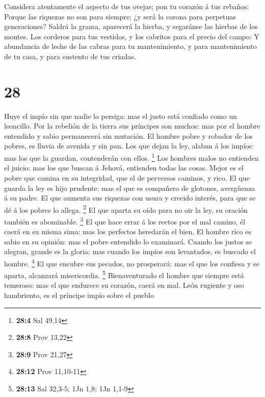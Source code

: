  Considera atentamente el aspecto de tus ovejas; pon tu
corazón á tus rebaños:  Porque las riquezas no son para
siempre; ¿y será la corona para perpetuas generaciones? 
Saldrá la grama, aparecerá la hierba, y segaránse las hierbas de los
montes.  Los corderos para tus vestidos, y los cabritos
para el precio del campo:  Y abundancia de leche de las
cabras para tu mantenimiento, y para mantenimiento de tu casa, y para
sustento de tus criadas.

\hypertarget{section-27}{%
\section{28}\label{section-27}}

 Huye el impío sin que nadie lo persiga: mas el justo está
confiado como un leoncillo.  Por la rebelión de la tierra
sus príncipes son muchos: mas por el hombre entendido y sabio
permanecerá sin mutación.  El hombre pobre y robador de
los pobres, es lluvia de avenida y sin pan.  Los que dejan
la ley, alaban á los impíos: mas los que la guardan, contenderán con
ellos. \footnote{\textbf{28:4} Sal 49,14}  Los hombres
malos no entienden el juicio: mas los que buscan á Jehová, entienden
todas las cosas.  Mejor es el pobre que camina en su
integridad, que el de perversos caminos, y rico.  El que
guarda la ley es hijo prudente: mas el que es compañero de glotones,
avergüenza á su padre.  El que aumenta sus riquezas con
usura y crecido interés, para que se dé á los pobres lo allega.
\footnote{\textbf{28:8} Prov 13,22}  El que aparta su oído
para no oir la ley, su oración también es abominable. \footnote{\textbf{28:9}
  Prov 21,27}  El que hace errar á los rectos por el mal
camino, él caerá en su misma sima: mas los perfectos heredarán el bien.
 El hombre rico es sabio en su opinión: mas el pobre
entendido lo examinará.  Cuando los justos se alegran,
grande es la gloria; mas cuando los impíos son levantados, es buscado el
hombre. \footnote{\textbf{28:12} Prov 11,10-11}  El que
encubre sus pecados, no prosperará: mas el que los confiesa y se aparta,
alcanzará misericordia. \footnote{\textbf{28:13} Sal 32,3-5; 1Jn 1,8;
  1Jn 1,1-9}  Bienaventurado el hombre que siempre está
temeroso: mas el que endurece su corazón, caerá en mal. 
León rugiente y oso hambriento, es el príncipe impío sobre el pueblo
